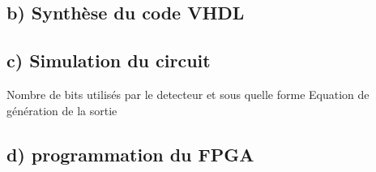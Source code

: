 \documentclass[11pt]{report}
\begin{document}
\subsection{ b) Synthèse du code VHDL }
 
  \subsection{ c) Simulation du circuit}
  
  Nombre de bits utilisés par le detecteur et sous quelle forme
  Equation de génération de la sortie
  
  
   \subsection{ d) programmation du FPGA}
\end{document}
